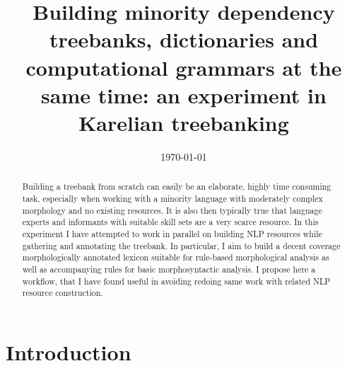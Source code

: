 \documentclass[11pt]{article}
\newif\ifcameraready%
\begin{document}
\title{Building minority dependency treebanks, dictionaries and computational
grammars at the same time: an experiment in Karelian treebanking}

\ifcameraready{}
\author{Tommi A Pirinen\\
Universität Hamburg\\
Hamburger Zentrum für Sprachkorpora\\
Max-Brauer-Allee 60, D-22765 Hamburg\\
\url{tommi.antero.pirinen@uni-hamburg.de}
}
\fi

\date{\today}


\maketitle

\begin{abstract}
    Building a treebank from scratch can easily be an elaborate, highly time
    consuming task, especially when working with a minority
    language with moderately complex morphology and no existing resources. It is
    also then typically true that language experts and informants with
    suitable skill sets are a very scarce resource.  In this experiment I have
    attempted to work in parallel on building NLP resources while gathering and
    annotating the treebank. In particular, I aim to build a decent coverage
    morphologically annotated lexicon suitable for rule-based morphological
    analysis as well as accompanying rules for basic morphosyntactic analysis.
    I propose here a workflow, that I have found useful in avoiding redoing same
    work with related NLP resource construction.
\end{abstract}



\section{Introduction}
\end{document}
